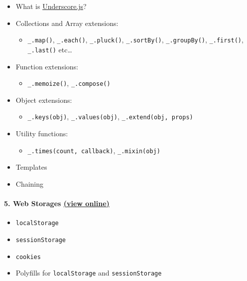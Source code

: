 \begin{itemize}
\tightlist
\item
  What is \href{http://underscorejs.org}{Underscore.js}?
\item
  Collections and Array extensions:

  \begin{itemize}
  \tightlist
  \item
    \texttt{\_.map()}, \texttt{\_.each()}, \texttt{\_.pluck()},
    \texttt{\_.sortBy()}, \texttt{\_.groupBy()}, \texttt{\_.first()},
    \texttt{\_.last()} etc\ldots{}
  \end{itemize}
\item
  Function extensions:

  \begin{itemize}
  \tightlist
  \item
    \texttt{\_.memoize()}, \texttt{\_.compose()}
  \end{itemize}
\item
  Object extensions:

  \begin{itemize}
  \tightlist
  \item
    \texttt{\_.keys(obj)}, \texttt{\_.values(obj)},
    \texttt{\_.extend(obj,\ props)}
  \end{itemize}
\item
  Utility functions:

  \begin{itemize}
  \tightlist
  \item
    \texttt{\_.times(count,\ callback)}, \texttt{\_.mixin(obj)}
  \end{itemize}
\item
  Templates
\item
  Chaining
\end{itemize}

\paragraph{\texorpdfstring{5. Web Storages
\href{https://rawgit.com/TelerikAcademy/JavaScript-Applications/master/05.\%20Web\%20Storages/slides/index.html\#/title}{(view
online)}}{5. Web Storages (view online)}}\label{web-storages-view-online}

\begin{itemize}
\tightlist
\item
  \texttt{localStorage}
\item
  \texttt{sessionStorage}
\item
  \texttt{cookies}
\item
  Polyfills for \texttt{localStorage} and \texttt{sessionStorage}
\end{itemize}

